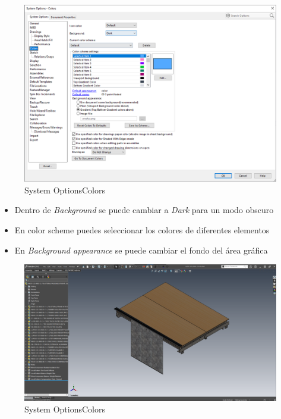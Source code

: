 \documentclass{report}
\begin{document}
\begin{figure}[H]
	\centering
	\includegraphics[width=0.95\linewidth, height=0.65\textheight,keepaspectratio]{Imagenes/solidworks_dark_mode01}
	\caption{System Options\textrightarrow Colors}
	\label{fig:solidworksdarkmode01}
\end{figure}

\begin{itemize}
	\item Dentro de \emph{Background} se puede cambiar a \emph{Dark} para un modo obscuro
	\item En color scheme puedes seleccionar los colores de diferentes elementos
	\item En \emph{Background appearance} se puede cambiar el fondo del área gráfica
\end{itemize}

\begin{figure}[H]
	\centering
	\includegraphics[width=0.95\linewidth, height=0.75\textheight,keepaspectratio]{Imagenes/solidworks_dark_mode02}
	\caption{System Options\textrightarrow Colors}
	\label{fig:solidworksdarkmode02}
\end{figure}
\end{document}
